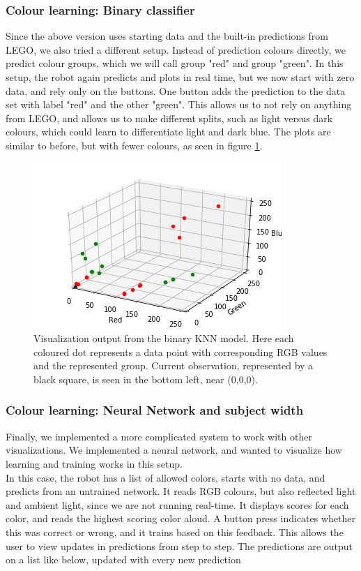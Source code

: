 \documentclass[11pt, a4paper]{article}
\begin{document}
\subsubsection{Colour learning: Binary classifier}
Since the above version uses starting data and the built-in predictions from LEGO, we also tried a different setup. Instead of prediction colours directly, we predict colour groups, which we will call group "red" and group "green". In this setup, the robot again predicts and plots in real time, but we now start with zero data, and rely only on the buttons. One button adds the prediction to the data set with label "red" and the other "green". This allows us to not rely on anything from LEGO, and allows us to make different splits, such as light versus dark colours, which could learn to differentiate light and dark blue. The plots are similar to before, but with fewer colours, as seen in figure \ref{fig:colour_KNN_binary}.\\
\begin{figure}[H]
	\centering
	\includegraphics[scale=1]{images/ColourKNNversion2.png}	
	\caption{Visualization output from the binary KNN model. Here each coloured dot represents a data point with corresponding RGB values and the represented group. Current observation, represented by a black square, is seen in the bottom left, near (0,0,0).}
	\label{fig:colour_KNN_binary}
\end{figure}
\subsubsection{Colour learning: Neural Network and subject width}
Finally, we implemented a more complicated system to work with other visualizations. We implemented a neural network, and wanted to visualize how learning and training works in this setup.  \\
In this case, the robot has a list of allowed colors, starts with no data, and predicts from an untrained network. It reads RGB colours, but also reflected light and ambient light, since we are not running real-time. It displays scores for each color, and reads the highest scoring color aloud. A button press indicates whether this was correct or wrong, and it trains based on this feedback. This allows the user to view updates in predictions from step to step. The predictions are output on a list like below, updated with every new prediction \\
\end{document}
